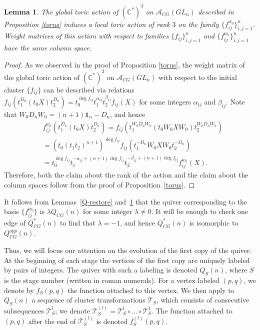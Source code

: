 \documentclass{amsart}
\newtheorem{lemma}[theorem]{Lemma}
\theoremstyle{definition}
\theoremstyle{remark}
\numberwithin{equation}{section}
\numberwithin{theorem}{section}
\begin{document}
\begin{lemma}
\label{antitorus}
The global toric action of $(\mathbb{C^*})^3$ on ${{\mathcal A}}_{CG}(GL_n)$ described in Proposition \ref{torus} induces a local toric
action of rank $3$ on the family $\{f_{ij}^{w_0}\}_{i,j=1}^n$.  Weight matrices of this action with respect to families $\{f_{ij}\}_{i,j=1}^n$ and $\{f_{ij}^{w_0}\}_{i,j=1}^n$ have the same column space.
\end{lemma}

\begin{proof} As we observed in the proof of Proposition \ref{torus}, the weight matrix of the global toric action of $(\mathbb{C^*})^3$ on ${{\mathcal A}}_{CG}(GL_n)$ with respect to the initial cluster $\{f_{ij}\}$ can be described via relations
$f_{ij} \left ( t_1^{D_n} (t_0 X) t_2^{D_n}\right ) = t_0^{{{\operatorname{deg}}} f_{ij}} t_1^{\alpha_{ij}} t_2^{\beta_{ij}} f_{ij}(X)$ for some integers $\alpha_{ij}$ and $\beta_{ij}$.
Note that $W_0 D_n W_0 = (n+1) {\mathbf 1}_n - D_n$, and hence
\begin{align*}
&f^{w_0}_{ij} \left ( t_1^{D_n} (t_0 X) t_2^{D_n}\right ) = f_{ij} \left ( t_1^{W_0 D_n W_0} (t_0 W_0 X W_0) t_2^{W_0 D_n W_0}\right )\\
& = \left (t_0 (t_1 t_2)^{n+1}\right )^{{{\operatorname{deg}}} f_{ij}} f_{ij} \left ( t_1^{-D_n} W_0 X W_0 t_2^{-D_n}\right )\\
&=
t_0^{{{\operatorname{deg}}} f_{ij}} t_1^{-\alpha_{ij} + (n+1) {{\operatorname{deg}}} f_{ij}} t_2^{-\beta_{ij}+ (n+1) {{\operatorname{deg}}} f_{ij}} f^{w_0}_{ij}(X).
\end{align*}
Therefore, both the claim about the rank of the action and the claim about the column spaces follow
from the proof of Proposition~\ref{torus}.
\end{proof}

It follows from
Lemmas~\ref{Q-restore} and~\ref{antitorus} that the quiver corresponding to the basis 
$\{f^{w_0}_{ij}\}$ is $\lambda Q_{CG}(n)$ for 
some integer $\lambda\ne0$. It will be enough to check one edge of $Q^*_{CG}(n)$ to find that
 $\lambda=-1$, and hence  $Q^*_{CG}(n)$ is isomorphic to $Q_{CG}^{opp}(n)$.

Thus, we will focus our attention on the evolution of the first copy of the quiver. At the 
beginning of each stage the vertices of the first copy are uniquely labeled by pairs of integers. 
The quiver with such a labeling is denoted $Q_S(n)$, where $S$ is the
stage number (written in roman numerals). For a 
vertex labeled $(p,q)$, we denote by $f_S(p,q)$ the function attached to this vertex.  We then apply to
$Q_S(n)$ a sequence of cluster transformations ${{\mathcal T}}_S$, which consists of consecutive subsequences
${{\mathcal T}}_S^l$; we denote ${{\mathcal T}}_S^{(l)}={{\mathcal T}}_S^l\circ\dots\circ{{\mathcal T}}_S^1$. The function attached to $(p,q)$ after
the end of ${{\mathcal T}}_S^{(l)}$ is denoted $f_S^{(l)}(p,q)$.
\end{document}
